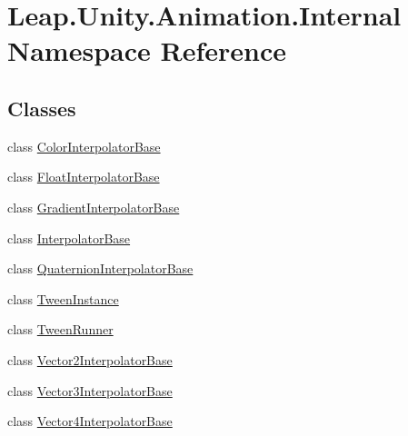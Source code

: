 \hypertarget{namespace_leap_1_1_unity_1_1_animation_1_1_internal}{}\section{Leap.\+Unity.\+Animation.\+Internal Namespace Reference}
\label{namespace_leap_1_1_unity_1_1_animation_1_1_internal}
\subsection*{Classes}
\begin{DoxyCompactItemize}
\item 
class \mbox{\hyperlink{class_leap_1_1_unity_1_1_animation_1_1_internal_1_1_color_interpolator_base}{Color\+Interpolator\+Base}}
\item 
class \mbox{\hyperlink{class_leap_1_1_unity_1_1_animation_1_1_internal_1_1_float_interpolator_base}{Float\+Interpolator\+Base}}
\item 
class \mbox{\hyperlink{class_leap_1_1_unity_1_1_animation_1_1_internal_1_1_gradient_interpolator_base}{Gradient\+Interpolator\+Base}}
\item 
class \mbox{\hyperlink{class_leap_1_1_unity_1_1_animation_1_1_internal_1_1_interpolator_base}{Interpolator\+Base}}
\item 
class \mbox{\hyperlink{class_leap_1_1_unity_1_1_animation_1_1_internal_1_1_quaternion_interpolator_base}{Quaternion\+Interpolator\+Base}}
\item 
class \mbox{\hyperlink{class_leap_1_1_unity_1_1_animation_1_1_internal_1_1_tween_instance}{Tween\+Instance}}
\item 
class \mbox{\hyperlink{class_leap_1_1_unity_1_1_animation_1_1_internal_1_1_tween_runner}{Tween\+Runner}}
\item 
class \mbox{\hyperlink{class_leap_1_1_unity_1_1_animation_1_1_internal_1_1_vector2_interpolator_base}{Vector2\+Interpolator\+Base}}
\item 
class \mbox{\hyperlink{class_leap_1_1_unity_1_1_animation_1_1_internal_1_1_vector3_interpolator_base}{Vector3\+Interpolator\+Base}}
\item 
class \mbox{\hyperlink{class_leap_1_1_unity_1_1_animation_1_1_internal_1_1_vector4_interpolator_base}{Vector4\+Interpolator\+Base}}
\end{DoxyCompactItemize}
